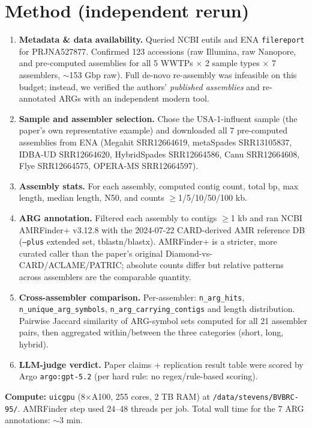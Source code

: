 \documentclass[11pt]{article}
\begin{document}
\section{Method (independent rerun)}
\begin{enumerate}
\item \textbf{Metadata \& data availability.} Queried NCBI eutils and ENA \texttt{filereport} for PRJNA527877. Confirmed 123 accessions (raw Illumina, raw Nanopore, and pre-computed assemblies for all 5 WWTPs $\times$ 2 sample types $\times$ 7 assemblers, $\sim$153 Gbp raw). Full de-novo re-assembly was infeasible on this budget; instead, we verified the authors' \textit{published assemblies} and re-annotated ARGs with an independent modern tool.
\item \textbf{Sample and assembler selection.} Chose the USA-1-influent sample (the paper's own representative example) and downloaded all 7 pre-computed assemblies from ENA (Megahit SRR12664619, metaSpades SRR13105837, IDBA-UD SRR12664620, HybridSpades SRR12664586, Canu SRR12664608, Flye SRR12664575, OPERA-MS SRR12664597).
\item \textbf{Assembly stats.} For each assembly, computed contig count, total bp, max length, median length, N50, and counts $\geq$1/5/10/50/100 kb.
\item \textbf{ARG annotation.} Filtered each assembly to contigs $\geq$1 kb and ran NCBI AMRFinder+ v3.12.8 with the 2024-07-22 CARD-derived AMR reference DB (\texttt{--plus} extended set, tblastn/blastx). AMRFinder+ is a stricter, more curated caller than the paper's original Diamond-vs-CARD/ACLAME/PATRIC; absolute counts differ but relative patterns across assemblers are the comparable quantity.
\item \textbf{Cross-assembler comparison.} Per-assembler: \texttt{n\_arg\_hits}, \texttt{n\_unique\_arg\_symbols}, \texttt{n\_arg\_carrying\_contigs} and length distribution. Pairwise Jaccard similarity of ARG-symbol sets computed for all 21 assembler pairs, then aggregated within/between the three categories (short, long, hybrid).
\item \textbf{LLM-judge verdict.} Paper claims + replication result table were scored by Argo \texttt{argo:gpt-5.2} (per hard rule: no regex/rule-based scoring).
\end{enumerate}

\textbf{Compute:} \texttt{uicgpu} (8$\times$A100, 255 cores, 2 TB RAM) at \texttt{/data/stevens/BVBRC-95/}. AMRFinder step used 24--48 threads per job. Total wall time for the 7 ARG annotations: $\sim$3 min.
\end{document}
